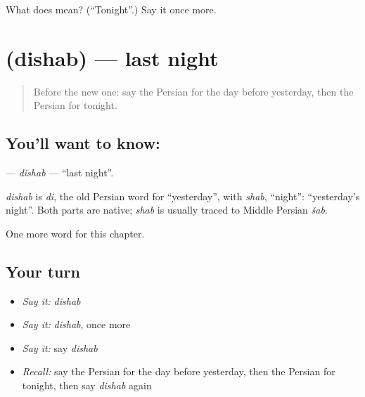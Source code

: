 \begin{tcolorbox}[breakable,colback=teal!4,colframe=teal!35!black,title={Before you move on}]
What does  mean? (\textquotedblleft{}Tonight\textquotedblright{}.) Say it once more.
\end{tcolorbox}
\section[\texorpdfstring{\fa{دیشب} (dishab)}{دیشب (dishab)}]{ (dishab) — last night}

\label{lesson:FA-C79-dishab}



\begin{quote}
Before the new one: say the Persian for the day before yesterday, then the Persian for tonight.
\end{quote}

\subsection*{You'll want to know: }
\textbf{} — \emph{dishab} — \textquotedblleft{}last night\textquotedblright{}.

\begin{cousinweb}
\emph{dishab} is \emph{di}, the old Persian word for \textquotedblleft{}yesterday\textquotedblright{}, with \emph{shab}, \textquotedblleft{}night\textquotedblright{}: \textquotedblleft{}yesterday's night\textquotedblright{}. Both parts are native; \emph{shab} is usually traced to Middle Persian \emph{šab}.
\end{cousinweb}

\begin{grammarlens}[title={What you've built}]
One more word for this chapter.
\end{grammarlens}

\subsection*{Your turn}
\begin{itemize}
\raggedright
  \item \emph{Say it:} \emph{dishab}
  \item \emph{Say it:} \emph{dishab}, once more
  \item \emph{Say it:} say \emph{dishab}
  \item \emph{Recall:} say the Persian for the day before yesterday, then the Persian for tonight, then say \emph{dishab} again
\end{itemize}

